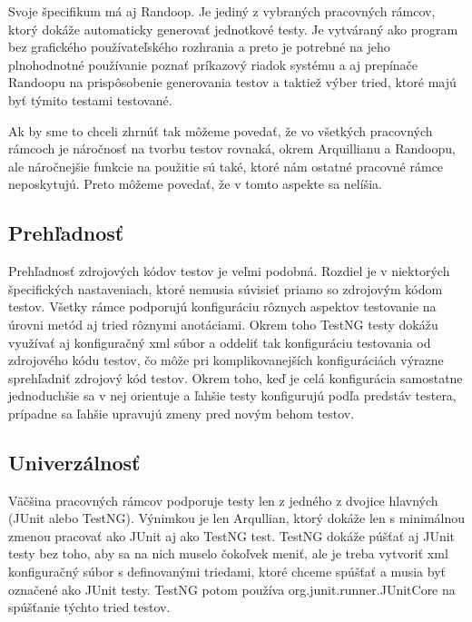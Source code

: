 \documentclass[11pt,twoside,slovak,a4paper]{article}
\begin{document}
	Svoje špecifikum má aj Randoop. Je jediný z vybraných pracovných rámcov, ktorý dokáže automaticky generovať jednotkové testy. Je vytváraný ako program bez grafického používateľského rozhrania a preto je potrebné na jeho plnohodnotné používanie poznať príkazový riadok systému a aj prepínače Randoopu na prispôsobenie generovania testov a taktiež výber tried, ktoré majú byť týmito testami testované.
	
	Ak by sme to chceli zhrnúť tak môžeme povedať, že vo všetkých pracovných rámcoch je náročnosť na tvorbu testov rovnaká, okrem Arquillianu a Randoopu, ale náročnejšie funkcie na použitie sú také, ktoré nám ostatné pracovné rámce neposkytujú. Preto môžeme povedať, že v tomto aspekte sa nelíšia.
	
	\subsection{Prehľadnosť}
	Prehľadnosť zdrojových kódov testov je veľmi podobná. Rozdiel je v niektorých špecifických nastaveniach, ktoré nemusia súvisieť priamo so zdrojovým kódom testov. Všetky rámce podporujú konfiguráciu rôznych aspektov testovanie na úrovni metód aj tried rôznymi anotáciami. Okrem toho TestNG testy dokážu využívať aj konfiguračný xml súbor a oddeliť tak konfiguráciu testovania od zdrojového kódu testov, čo môže pri komplikovanejších konfiguráciách výrazne sprehľadniť zdrojový kód testov. Okrem toho, keď je celá konfigurácia samostatne jednoduchšie sa v nej orientuje a ľahšie testy konfigurujú podľa predstáv testera, prípadne sa ľahšie upravujú zmeny pred novým behom testov.
	
	\subsection{Univerzálnosť}
	Väčšina pracovných rámcov podporuje testy len z jedného z dvojice hlavných (JUnit alebo TestNG). Výnimkou je len Arqullian, ktorý dokáže len s minimálnou zmenou pracovať ako JUnit aj ako TestNG test. TestNG dokáže púšťať aj JUnit testy bez toho, aby sa na nich muselo čokoľvek meniť, ale je treba vytvoriť xml konfiguračný súbor s definovanými triedami, ktoré chceme spúšťať a musia byť označené ako JUnit testy. TestNG potom používa org.junit.runner.JUnitCore na spúšťanie týchto tried testov.
	
\end{document}
